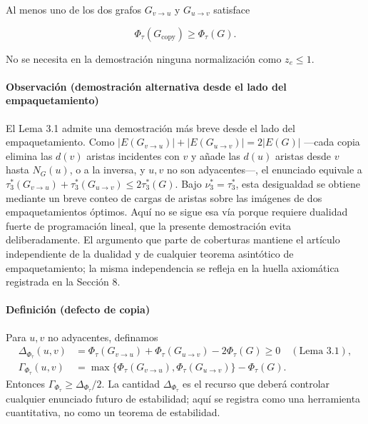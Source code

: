 \documentclass[spanish,11pt,a4paper]{article}
\begin{document}
Al menos uno de los dos grafos \(G_{v\to u}\) y \(G_{u\to v}\) satisface

\[
\Phi_\tau(G_{\mathrm{copy}})\ge\Phi_\tau(G).
\]

No se necesita en la demostración ninguna normalización como
\(z_e\le1\).

\paragraph{Observación (demostración alternativa desde el lado del
empaquetamiento)}\label{observaciuxf3n-demostraciuxf3n-alternativa-desde-el-lado-del-empaquetamiento}

El Lema 3.1 admite una demostración más breve desde el lado del
empaquetamiento. Como \(|E(G_{v\to u})|+|E(G_{u\to v})|=2|E(G)|\)
---cada copia elimina las \(d(v)\) aristas incidentes con \(v\) y añade
las \(d(u)\) aristas desde \(v\) hasta \(N_G(u)\), o a la inversa, y
\(u,v\) no son adyacentes---, el enunciado equivale a
\(\tau_3^*(G_{v\to u})+\tau_3^*(G_{u\to v})\le2\tau_3^*(G)\). Bajo
\(\nu_3^*=\tau_3^*\), esta desigualdad se obtiene mediante un breve
conteo de cargas de aristas sobre las imágenes de dos empaquetamientos
óptimos. Aquí no se sigue esa vía porque requiere dualidad fuerte de
programación lineal, que la presente demostración evita deliberadamente.
El argumento que parte de coberturas mantiene el artículo independiente
de la dualidad y de cualquier teorema asintótico de empaquetamiento; la
misma independencia se refleja en la huella axiomática registrada en la
Sección 8.

\paragraph{Definición (defecto de
copia)}\label{definiciuxf3n-defecto-de-copia}

Para \(u,v\) no adyacentes, definamos \[
\begin{aligned}
\Delta_{\Phi_\tau}(u,v)
&=\Phi_\tau(G_{v\to u})+\Phi_\tau(G_{u\to v})-2\Phi_\tau(G)\ge0
\quad(\text{Lema 3.1}),\\
\Gamma_{\Phi_\tau}(u,v)
&=\max\{\Phi_\tau(G_{v\to u}),\Phi_\tau(G_{u\to v})\}-\Phi_\tau(G).
\end{aligned}
\] Entonces \(\Gamma_{\Phi_\tau}\ge\Delta_{\Phi_\tau}/2\). La cantidad
\(\Delta_{\Phi_\tau}\) es el recurso que deberá controlar cualquier
enunciado futuro de estabilidad; aquí se registra como una herramienta
cuantitativa, no como un teorema de estabilidad.
\end{document}
